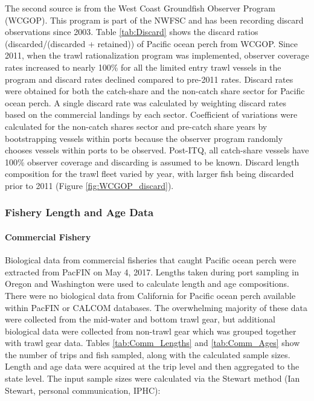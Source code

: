\documentclass[12pt,]{article}
\let\oldparagraph\paragraph
\renewcommand{\paragraph}[1]{\oldparagraph{#1}\mbox{}}
\begin{document}
The second source is from the West Coast Groundfish Observer Program
(WCGOP). This program is part of the NWFSC and has been recording
discard observations since 2003. Table \ref{tab:Discard} shows the
discard ratios (discarded/(discarded + retained)) of Pacific ocean perch
from WCGOP. Since 2011, when the trawl rationalization program was
implemented, observer coverage rates increased to nearly 100\% for all
the limited entry trawl vessels in the program and discard rates
declined compared to pre-2011 rates. Discard rates were obtained for
both the catch-share and the non-catch share sector for Pacific ocean
perch. A single discard rate was calculated by weighting discard rates
based on the commercial landings by each sector. Coefficient of
variations were calculated for the non-catch shares sector and pre-catch
share years by bootstrapping vessels within ports because the observer
program randomly chooses vessels within ports to be observed. Post-ITQ,
all catch-share vessels have 100\% observer coverage and discarding is
assumed to be known. Discard length composition for the trawl fleet
varied by year, with larger fish being discarded prior to 2011 (Figure
\ref{fig:WCGOP_discard}).

\subsubsection{Fishery Length and Age
Data}\label{fishery-length-and-age-data}

\paragraph{Commercial Fishery}\label{commercial-fishery}

Biological data from commercial fisheries that caught Pacific ocean
perch were extracted from PacFIN on May 4, 2017. Lengths taken during
port sampling in Oregon and Washington were used to calculate length and
age compositions. There were no biological data from California for
Pacific ocean perch available within PacFIN or CALCOM databases. The
overwhelming majority of these data were collected from the mid-water
and bottom trawl gear, but additional biological data were collected
from non-trawl gear which was grouped together with trawl gear data.
Tables \ref{tab:Comm_Lengths} and \ref{tab:Comm_Ages} show the number of
trips and fish sampled, along with the calculated sample sizes. Length
and age data were acquired at the trip level and then aggregated to the
state level. The input sample sizes were calculated via the Stewart
method (Ian Stewart, personal communication, IPHC):
\end{document}
